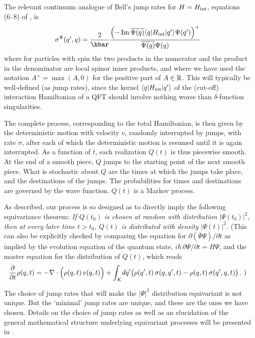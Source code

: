 \documentclass[12pt]{article}
\begin{document}
The relevant continuum analogue of Bell's jump rates for $H=H_{\mathrm{int}}$,
equations (6--8) of \cite[p.~173]{BellBible}, is
\begin{equation}\label{sigma}
  \sigma^{\Psi}(q',q)= {\frac2{\hbar}}\frac{\left(-\Im
  \overline{\Psi(q)}\langle q| H_{\inter} | q' \rangle
  \Psi(q')\right)^+}{\overline{\Psi(q)}\Psi(q)} 
\end{equation}
where for particles with spin the two products in the numerator and the
product in the denominator are local spinor inner products, and where we
have used the notation $A^+ = \max(A,0)$ for the positive part of
$A\in\mathbb{R}$. This will typically be well-defined (as jump rates), since the
kernel $\langle q| H_{\mathrm{int}} | q' \rangle$ of the (cut-off) interaction
Hamiltonian of a QFT should involve nothing worse than $\delta$-function
singularities.

The complete process, corresponding to the total Hamiltonian, is then given
by the deterministic motion with velocity $v$, randomly interrupted by
jumps, with rate $\sigma$, after each of which the deterministic motion is
resumed until it is again interrupted. As a function of $t$, each
realization $Q(t)$ is thus piecewise smooth. At the end of a smooth piece,
$Q$ jumps to the starting point of the next smooth piece.  What is
stochastic about $Q$ are the times at which the jumps take place, and the
destinations of the jumps. The probabilities for times and destinations are
governed by the wave function. $Q(t)$ is a Markov process. 

As described, our process is so designed as to directly imply the
following equivariance theorem: \textit{If $Q(t_0)$ is chosen at
random with distribution $|\Psi(t_0)|^2$, then at every later time
$t>t_0$, $Q(t)$ is distributed with density $|\Psi(t)|^2$.} (This can
also be explicitly checked by comparing the equation for $\partial
(\overline{\Psi} \Psi)/\partial t$ as implied by the evolution
equation of the quantum state, $i\hbar\,\partial\Psi/\partial t = H
\Psi$, and the master equation for the distribution of $Q(t)$, which
reads
$$
  \frac{\partial}{\partial t} \rho(q,t) = 
  -\nabla\cdot \Big( \rho(q,t)\, v(q,t)\Big) +
  \int_K \! d q' \big( \rho(q',t)\,\sigma(q,q',t) -
  \rho(q,t)\,\sigma(q',q,t) \big) \,.\ )
$$


The choice of jump rates that will make the $|\Psi|^2$ distribution
equivariant is not unique. But the `minimal' jump rates are unique, and
these are the ones we have chosen. Details on the choice of jump rates as
well as an elucidation of the general mathematical structure underlying
equivariant processes will be presented in \cite{creation2}.
\end{document}
